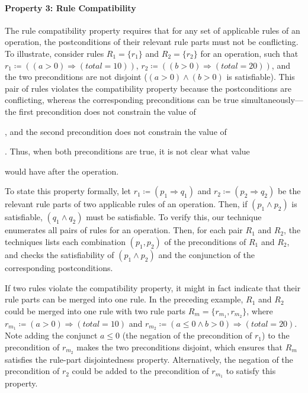 \vspace*{-5pt}
\paragraph*{Property 3: Rule Compatibility}
The rule compatibility property requires that for any set of applicable rules of
an operation, the postconditions of their relevant rule parts must not be
conflicting. To illustrate, consider rules $R_1 = \{r_1\}$ and $R_2 = \{r_2\}$
for an operation, such that $r_1 \coloneqq ((a > 0) \Longrightarrow (total =
10))$, $r_2 \coloneqq ((b > 0) \Longrightarrow (total = 20))$, and the two
preconditions are not disjoint (\ie $(a > 0) \wedge (b > 0)$ is
satisfiable). This pair of rules violates the compatibility property because the
postconditions are conflicting, whereas the corresponding preconditions can be
true simultaneously---the first precondition does not constrain the value of
\subject{b}, and the second precondition does not constrain the value of
\subject{a}. Thus, when both preconditions are true, it is not clear what value
\subject{total} would have after the operation.

To state this property formally, let $r_1 \coloneqq (p_1 \Longrightarrow q_1)$
and $r_2 \coloneqq (p_2 \Longrightarrow q_2)$ be the relevant rule parts of two
applicable rules of an operation. Then, if $(p_1 \wedge p_2)$ is satisfiable,
$(q_1 \wedge q_2)$ must be satisfiable. To verify this, our technique enumerates
all pairs of rules for an operation. Then, for each pair $R_1$ and $R_2$, the
techniques lists each combination $(p_1, p_2)$ of the preconditions of $R_1$ and
$R_2$, and checks the satisfiability of $(p_1 \wedge p_2)$ and the conjunction
of the corresponding postconditions.

If two rules violate the compatibility property, it might in fact indicate that
their rule parts can be merged into one rule. In the preceding example, $R_1$
and $R_2$ could be merged into one rule with two rule parts $R_m = \{r_{m_1},
r_{m_2}\}$, where $r_{m_1} \coloneqq (a > 0) \Longrightarrow (total = 10)$ and
$r_{m_2} \coloneqq (a \leq 0 \wedge b > 0) \Longrightarrow (total = 20)$. Note
adding the conjunct $a \leq 0$ (the negation of the precondition of $r_1$) to
the precondition of $r_{m_2}$ makes the two preconditions disjoint, which
ensures that $R_m$ satisfies the rule-part disjointedness
property. Alternatively, the negation of the precondition of $r_2$ could be
added to the precondition of $r_{m_1}$ to satisfy this property.

